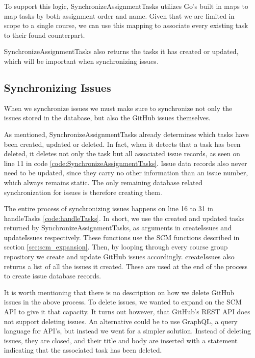 To support this logic, SynchronizeAssignmentTasks utilizes Go's built in maps to map tasks by both assignment order and name.
Given that we are limited in scope to a single course, we can use this mapping to associate every existing task to their found counterpart.



SynchronizeAssignmentTasks also returns the tasks it has created or updated, which will be important when synchronizing issues.

\subsection{Synchronizing Issues}

When we synchronize issues we must make sure to synchronize not only the issues stored in the database, but also the GitHub issues themselves.

As mentioned, SynchronizeAssignmentTasks already determines which tasks have been created, updated or deleted.
In fact, when it detects that a task has been deleted, it deletes not only the task but all associated issue records, as seen on line 11 in code \ref{code:SynchronizeAssignmentTasks}.
Issue data records also never need to be updated, since they carry no other information than an issue number, which always remains static.
The only remaining database related synchronization for issues is therefore creating them.

The entire process of synchronizing issues happens on line 16 to 31 in handleTasks \ref{code:handleTasks}.
In short, we use the created and updated tasks returned by SynchronizeAssignmentTasks, as arguments in createIssues and updateIssues respectively.
These functions use the SCM functions described in section \ref{sec:scm_expansion}.
Then, by looping through every course group repository we create and update GitHub issues accordingly.
createIssues also returns a list of all the issues it created.
These are used at the end of the process to create issue database records.

It is worth mentioning that there is no description on how we delete GitHub issues in the above process.
To delete issues, we wanted to expand on the SCM API to give it that capacity.
It turns out however, that GitHub's REST API does not support deleting issues.
An alternative could be to use GraphQL, a query language for API's, but instead we went for a simpler solution.
Instead of deleting issues, they are closed, and their title and body are inserted with a statement indicating that the associated task has been deleted.

